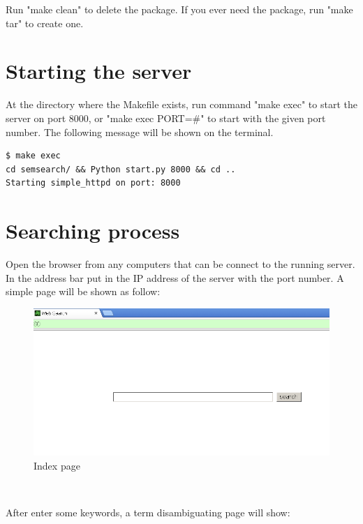 \documentclass[12pt]{cls}
\begin{document}
Run "make clean" to delete the package. If you ever need the package, run "make tar" to create one.

\section{Starting the server}

At the directory where the Makefile exists, run command "make exec" to start the server on port 8000, or "make exec PORT=\#" to start with the given port number. The following message will be shown on the terminal.

\begin{verbatim}
$ make exec
cd semsearch/ && Python start.py 8000 && cd ..
Starting simple_httpd on port: 8000
\end{verbatim}

\section{Searching process}

Open the browser from any computers that can be connect to the running server. In the address bar put in the IP address of the server with the port number. A simple page will be shown as follow:

\begin{figure}[H]
\centering
\includegraphics[width=\textwidth]{figures/page1.png}
\caption{Index page}
\label{Index page}
\end{figure}

\begin{center}
~\\
\end{center}

After enter some keywords, a term disambiguating page will show:
\end{document}
